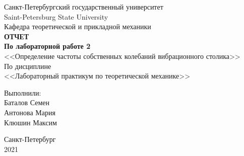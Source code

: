 \documentclass[12pt, a4paper]{article}
\begin{document}
    
    \begin{center}
        \large{Санкт-Петербургский государственный университет} \\
        \large{Saint-Petersburg State University}\\
        \hfill \break
        \hfill \break
        \hfill \break
        \hfill \break
        \hfill \break
        \hfill \break
        \hfill \break
        \large{Кафедра теоретической и прикладной механики} \\
        \hfill \break
        \hfill \break
        \large{\textbf{ОТЧЕТ}} \\
        \large{\textbf{По лабораторной работе 2}} \\
        \large{<<Определение частоты собственных колебаний вибрационного 
            столика>>} \\
        \hfill \break
        \hfill \break
        \hfill \break
        \large{По дисциплине} \\
        \large{<<Лабораторный практикум по теоретической механике>>} \\
    \end{center}
    
    \hfill \break
    \hfill \break
    \hfill \break
    \hfill \break
    \hfill \break
    \hfill \break
    \hfill \break
    
    \begin{flushleft} 
        \large{Выполнили:} \\
        \large{Баталов Семен} \\
        \large{Антонова Мария} \\
        \large{Клюшин Максим} \\
    \end{flushleft}
    
    \hfill \break
    \hfill \break
    \hfill \break
    \hfill \break
    
    \begin{center} 
        \large{Санкт-Петербург} \\
        \large{2021} \\
    \end{center}
    
    \thispagestyle{empty}
    \newpage
    
\end{document}
